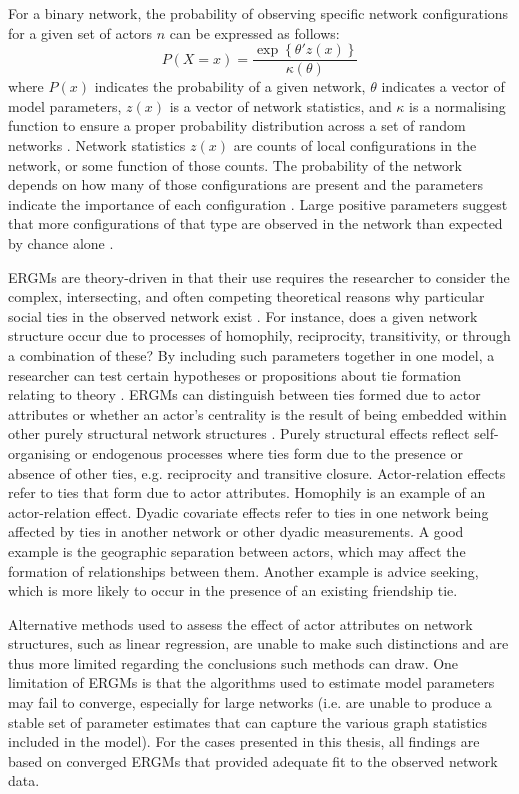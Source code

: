 For a binary network, the probability of observing specific network configurations for a given set of actors \(n\) can be expressed as follows: $$ P(X = x) = \frac{\exp \left \{ \theta'z(x)  \right \}}{\kappa (\theta )} $$ where $P(x)$ indicates the probability of a given network, $\theta$ indicates a vector of model parameters, $z(x)$ is a vector of network statistics, and $\kappa$ is a normalising function to ensure a proper probability distribution across a set of random networks \citep{shumate2010exponential}. Network statistics $z(x)$ are counts of local configurations in the network, or some function of those counts. The probability of the network depends on how many of those configurations are present and the parameters indicate the importance of each configuration \citep{lusher2013exponential}. Large positive parameters suggest that more configurations of that type are observed in the network than expected by chance alone \citep{robins2009closure}. \medskip

ERGMs are theory-driven in that their use requires the researcher to consider the complex, intersecting, and often competing theoretical reasons why particular social ties in the observed network exist \citep{lusher2020advances}. For instance, does a given network structure occur due to processes of homophily, reciprocity, transitivity, or through a combination of these? By including such parameters together in one model, a researcher can test certain hypotheses or propositions about tie formation relating to theory \citep{robins2007recent}. ERGMs can distinguish between ties formed due to actor attributes or whether an actor’s centrality is the result of being embedded within other purely structural network structures \citep{lusher2020advances}. Purely structural effects reflect self-organising or endogenous processes where ties form due to the presence or absence of other ties, e.g. reciprocity and transitive closure. Actor-relation effects refer to ties that form due to actor attributes. Homophily is an example of an actor-relation effect. Dyadic covariate effects refer to ties in one network being affected by ties in another network or other dyadic measurements. A good example is the geographic separation between actors, which may affect the formation of relationships between them. Another example is advice seeking, which is more likely to occur in the presence of an existing friendship tie. \medskip

Alternative methods used to assess the effect of actor attributes on network structures, such as linear regression, are unable to make such distinctions and are thus more limited regarding the conclusions such methods can draw. One limitation of ERGMs is that the algorithms used to estimate model parameters may fail to converge, especially for large networks (i.e. are unable to produce a stable set of parameter estimates that can capture the various graph statistics included in the model). For the cases presented in this thesis, all findings are based on converged ERGMs that provided adequate fit to the observed network data.

